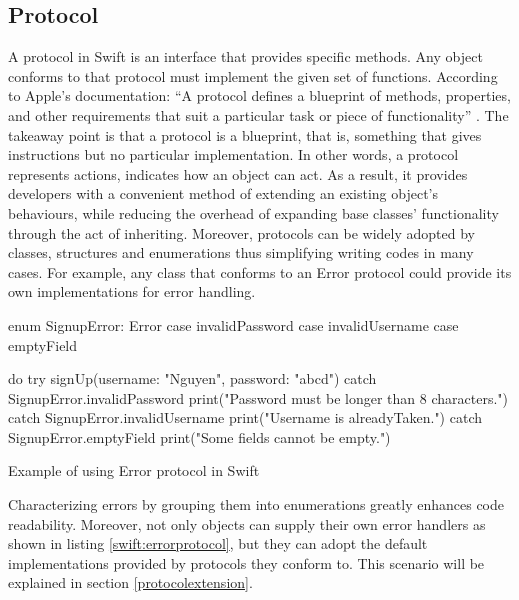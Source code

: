 \documentclass[11pt,a4paper,oneside,article]{memoir}
\begin{document}
\subsection{Protocol}
A protocol in Swift is an \gls{interface} that provides specific methods. Any object conforms to that protocol must implement the given set of functions. %
According to Apple's documentation: ``A protocol defines a blueprint of methods, properties, and other requirements that suit a particular task or piece of functionality'' \cite{apple:protocol}.
The takeaway point is that a protocol is a blueprint, that is, something that gives instructions but no particular implementation. In other words, a protocol represents actions, indicates how an object can act. As a result, it provides developers with a convenient method of extending an existing object's behaviours, while reducing the overhead of expanding base classes' functionality through the act of inheriting. Moreover, protocols can be widely adopted by classes, structures and enumerations \cite[p .41]{apple:swift} thus simplifying writing codes in many cases. For example, any class that conforms to an Error protocol could provide its own implementations for error handling. 

\begin{listing}[H]
\begin{SwiftCode}

enum SignupError: Error {
    case invalidPassword
    case invalidUsername
    case emptyField
}

do {
    try signUp(username: "Nguyen", password: "abcd")
} catch SignupError.invalidPassword {
    print("Password must be longer than 8 characters.")
} catch SignupError.invalidUsername {
    print("Username is alreadyTaken.")
} catch SignupError.emptyField {
    print("Some fields cannot be empty.")
}
\end{SwiftCode}
\caption{Example of using Error protocol in Swift}
\label{swift:errorprotocol}
\end{listing}

Characterizing errors by grouping them into enumerations greatly enhances code readability. Moreover, not only objects can supply their own error handlers as shown in listing \ref{swift:errorprotocol}, but they can adopt the default implementations provided by protocols they conform to. This scenario will be explained in section \ref{protocolextension}.
\end{document}
